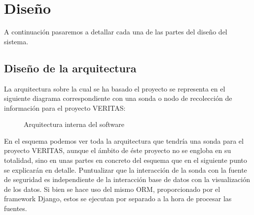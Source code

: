 \chapter{Diseño}
\label{chap:diseño}

A continuación pasaremos a detallar cada una de las partes del diseño del sistema.

\section{Diseño de la arquitectura}

La arquitectura sobre la cual se ha basado el proyecto se representa en el siguiente diagrama correspondiente con una sonda o nodo de recolección de información para el proyecto VERITAS:

\begin{figure}[H]
  \caption{Arquitectura interna del software}
\end{figure}

En el esquema podemos ver toda la arquitectura que tendría una sonda para el proyecto VERITAS, aunque el ámbito de éste proyecto no se engloba en su totalidad, sino en unas partes en concreto del esquema que en el siguiente punto se explicarán en detalle. Puntualizar que la interacción de la sonda con la fuente de seguridad es independiente de la interacción base de datos con la visualización de los datos. Si bien se hace uso del mismo ORM, proporcionado por el framework Django, estos se ejecutan por separado a la hora de procesar las fuentes.

